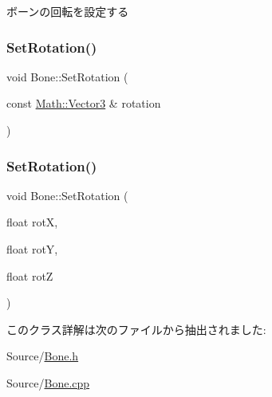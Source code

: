 ボーンの回転を設定する 

\mbox{\label{class_bone_a949005e4fab78a4072736614d6ec7886}} 
\subsubsection{\texorpdfstring{Set\+Rotation()}{SetRotation()}\hspace{0.1cm}{\footnotesize\ttfamily [2/3]}}
{\footnotesize\ttfamily void Bone\+::\+Set\+Rotation (\begin{DoxyParamCaption}\item[{const \mbox{\hyperlink{struct_math_1_1_vector3}{Math\+::\+Vector3}} \&}]{rotation }\end{DoxyParamCaption})}

\mbox{\label{class_bone_a8fd49736393fd37e5e029523e006c3a3}} 
\subsubsection{\texorpdfstring{Set\+Rotation()}{SetRotation()}\hspace{0.1cm}{\footnotesize\ttfamily [3/3]}}
{\footnotesize\ttfamily void Bone\+::\+Set\+Rotation (\begin{DoxyParamCaption}\item[{float}]{rotX,  }\item[{float}]{rotY,  }\item[{float}]{rotZ }\end{DoxyParamCaption})}



このクラス詳解は次のファイルから抽出されました\+:\begin{DoxyCompactItemize}
\item 
Source/\mbox{\hyperlink{_bone_8h}{Bone.\+h}}\item 
Source/\mbox{\hyperlink{_bone_8cpp}{Bone.\+cpp}}\end{DoxyCompactItemize}

